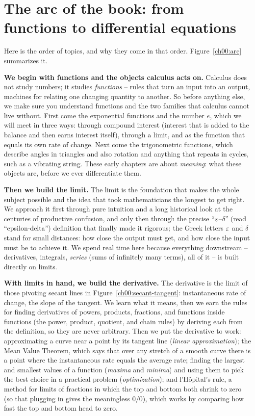 \section*{The arc of the book: from functions to differential equations}

Here is the order of topics, and why they come in that order. Figure~\ref{ch00:arc} summarizes it.

\textbf{We begin with functions and the objects calculus acts on.} Calculus does not study numbers;
it studies \emph{functions} -- rules that turn an input into an output, machines for relating one
changing quantity to another. So before anything else, we make sure you understand functions and the two families that calculus cannot live without. First come the exponential functions and the number $e$, which we will meet in three ways: through compound interest (interest that is added to the balance and then earns interest itself), through a limit, and as the function that equals its own rate of change. Next come the trigonometric functions, which describe angles in triangles and also rotation and anything that repeats in cycles, such as a vibrating string. These early
chapters are about \emph{meaning}: what these objects are, before we ever differentiate them.

\textbf{Then we build the limit.} The limit is the foundation that makes the
whole subject possible and the idea that took mathematicians the longest to get right. We approach
it first through pure intuition and a long historical look at the centuries of productive confusion,
and only then through the precise ``$\varepsilon$--$\delta$'' (read ``epsilon-delta'') definition that finally made it rigorous; the Greek letters $\varepsilon$ and $\delta$ stand for small distances: how close the output must get, and how close the input must be to achieve it. We
spend real time here because everything downstream -- derivatives, integrals, \emph{series} (sums of
infinitely many terms), all of it -- is built directly on limits.

\textbf{With limits in hand, we build the derivative.} The derivative is the limit of those pivoting
secant lines in Figure~\ref{ch00:secant-tangent}: instantaneous rate of change, the slope of the
tangent. We learn what it means, then we earn the rules for finding derivatives of powers, products,
fractions, and functions inside functions (the power, product, quotient, and chain rules) by deriving
each from the definition, so they are never arbitrary. Then
we put the derivative to work: approximating a curve near a point by its tangent line (\emph{linear
approximation}); the Mean Value Theorem, which says that over any stretch of a smooth curve there is a
point where the instantaneous rate equals the average rate; finding the largest and smallest values of
a function (\emph{maxima} and \emph{minima}) and using them to pick the best choice in a practical
problem (\emph{optimization}); and l'H\^opital's rule, a method for limits of fractions in which the
top and bottom both shrink to zero (so that plugging in gives the meaningless $0/0$), which works by
comparing how fast the top and bottom head to zero.

